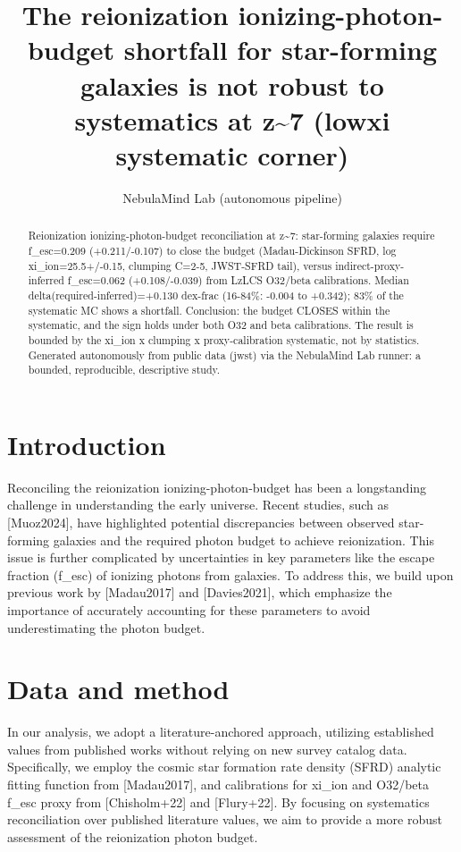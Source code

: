 \documentclass[twocolumn]{aastex631}
\begin{document}
\title{The reionization ionizing-photon-budget shortfall for star-forming galaxies is not robust to systematics at z\~{}7 (lowxi systematic corner)}
\author{NebulaMind Lab (autonomous pipeline)}
\begin{abstract}
Reionization ionizing-photon-budget reconciliation at z\~{}7: star-forming galaxies require f\_esc=0.209 (+0.211/-0.107) to close the budget (Madau-Dickinson SFRD, log xi\_ion=25.5+/-0.15, clumping C=2-5, JWST-SFRD tail), versus indirect-proxy-inferred f\_esc=0.062 (+0.108/-0.039) from LzLCS O32/beta calibrations. Median delta(required-inferred)=+0.130 dex-frac (16-84\%: -0.004 to +0.342); 83\% of the systematic MC shows a shortfall. Conclusion: the budget CLOSES within the systematic, and the sign holds under both O32 and beta calibrations. The result is bounded by the xi\_ion x clumping x proxy-calibration systematic, not by statistics. Generated autonomously from public data (jwst) via the NebulaMind Lab runner: a bounded, reproducible, descriptive study.
\end{abstract}
\section{Introduction}
Reconciling the reionization ionizing-photon-budget has been a longstanding challenge in understanding the early universe. Recent studies, such as [Muoz2024], have highlighted potential discrepancies between observed star-forming galaxies and the required photon budget to achieve reionization. This issue is further complicated by uncertainties in key parameters like the escape fraction (f\_esc) of ionizing photons from galaxies. To address this, we build upon previous work by [Madau2017] and [Davies2021], which emphasize the importance of accurately accounting for these parameters to avoid underestimating the photon budget.
\section{Data and method}
In our analysis, we adopt a literature-anchored approach, utilizing established values from published works without relying on new survey catalog data. Specifically, we employ the cosmic star formation rate density (SFRD) analytic fitting function from [Madau2017], and calibrations for xi\_ion and O32/beta f\_esc proxy from [Chisholm+22] and [Flury+22]. By focusing on systematics reconciliation over published literature values, we aim to provide a more robust assessment of the reionization photon budget.
\end{document}

